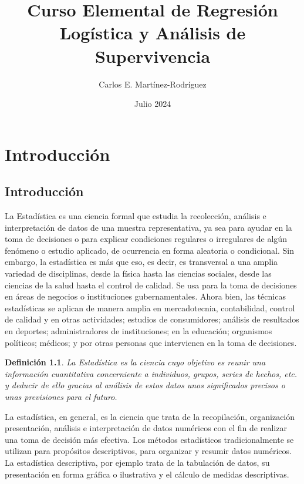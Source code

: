 \documentclass[a4paper]{report} %
\title{Curso Elemental de Regresi\'on Log\'istica y An\'alisis de Supervivencia}
\author{Carlos E. Mart\'inez-Rodr\'iguez}
\date{Julio 2024}
\newtheorem{Def}{Definici\'on}[chapter]
\begin{document}
\maketitle

\tableofcontents
\chapter{Introducci\'on}

\section{Introducci\'on}

La Estad\'istica es una ciencia formal que estudia la recolecci\'on, an\'alisis e interpretaci\'on de datos de una muestra representativa, ya sea para ayudar en la toma de decisiones o para explicar condiciones regulares o irregulares de alg\'un fen\'omeno o estudio aplicado, de ocurrencia en forma aleatoria o condicional. Sin embargo, la estad\'istica es m\'as que eso, es decir, es transversal a una amplia variedad de disciplinas, desde la f\'isica hasta las ciencias sociales, desde las ciencias de la salud hasta el control de calidad. Se usa para la toma de decisiones en \'areas de negocios o instituciones gubernamentales. Ahora bien, las t\'ecnicas estad\'isticas se aplican de manera amplia en mercadotecnia, contabilidad, control de calidad y en otras actividades; estudios de consumidores; an\'alisis de resultados en deportes; administradores de instituciones; en la educaci\'on; organismos pol\'iticos; m\'edicos; y por otras personas que intervienen en la toma de decisiones.

\begin{Def}
    La Estad\'istica es la ciencia cuyo objetivo es reunir una informaci\'on cuantitativa concerniente a individuos, grupos, series de hechos, etc. y deducir de ello gracias al an\'alisis de estos datos unos significados precisos o unas previsiones para el futuro.
\end{Def}

La estad\'istica, en general, es la ciencia que trata de la recopilaci\'on, organizaci\'on presentaci\'on, an\'alisis e interpretaci\'on de datos num\'ericos con el fin de realizar una toma de decisi\'on m\'as efectiva. Los m\'etodos estad\'isticos tradicionalmente se utilizan para prop\'ositos descriptivos, para organizar y resumir datos num\'ericos. La estad\'istica descriptiva, por ejemplo trata de la tabulaci\'on de datos, su presentaci\'on en forma gr\'afica o ilustrativa y el c\'alculo de medidas descriptivas.
\end{document}
